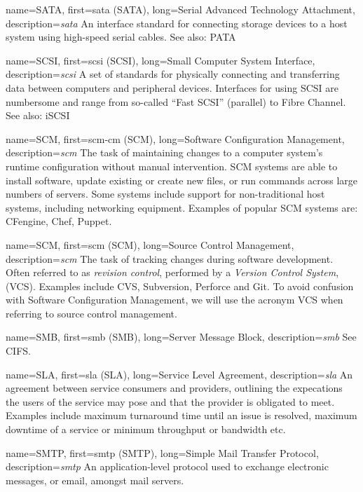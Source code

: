 {
	name={SATA},
	first={\acrlong{sata} (SATA)},
	long={Serial Advanced Technology Attachment},
	description={{\em \acrlong{sata}} An interface
standard for connecting storage devices to a host system using high-speed
serial cables.  See also: PATA}
}

{
	name={SCSI},
	first={\acrlong{scsi} (SCSI)},
	long={Small Computer System Interface},
	description={{\em \acrlong{scsi}} A set of standards for
physically connecting and transferring data between computers and
peripheral devices.  Interfaces for using SCSI are numbersome and range
from so-called ``Fast SCSI'' (parallel) to Fibre
Channel.  See also: iSCSI}
}

{
	name={SCM},
	first={\acrlong{scm-cm} (SCM)},
	long={Software Configuration Management},
	description={{\em \acrlong{scm}} The task of maintaining
changes to a computer system's runtime configuration without manual
intervention.  SCM systems are able to install software, update existing
or create new files, or run commands across large numbers of servers.
Some systems include support for non-traditional host systems, including
networking equipment.  Examples of popular SCM systems are: CFengine,
Chef, Puppet.}
}

{
	name={SCM},
	first={\acrlong{scm} (SCM)},
	long={Source Control Management},
	description={{\em \acrlong{scm}} The task of tracking changes
during software development.  Often referred to as {\em revision control},
performed by a {\em Version Control System}, (VCS).  Examples include CVS,
Subversion, Perforce and Git. To avoid confusion with Software
Configuration Management, we will use the acronym VCS when referring to
source control management.}
}

{
	name={SMB},
	first={\acrlong{smb} (SMB)},
	long={Server Message Block},
	description={{\em \acrlong{smb}} See CIFS.}
}

{
	name={SLA},
	first={\acrlong{sla} (SLA)},
	long={Service Level Agreement},
	description={{\em \acrlong{sla}} An agreement between service
consumers and providers, outlining the expecations the users of the
service may pose and that the provider is obligated to meet.  Examples
include maximum turnaround time until an issue is resolved, maximum
downtime of a service or minimum throughput or
bandwidth etc.}
}

{
	name={SMTP},
	first={\acrlong{smtp} (SMTP)},
	long={Simple Mail Transfer Protocol},
	description={{\em \acrlong{smtp}} An application-level
protocol used to exchange electronic messages, or email, amongst mail
servers.}
}

